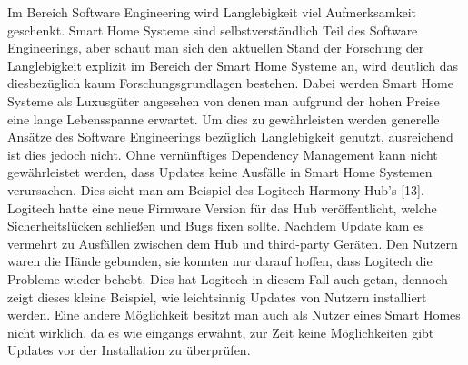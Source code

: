 Im Bereich Software Engineering wird Langlebigkeit viel Aufmerksamkeit geschenkt. Smart Home Systeme sind selbstverständlich Teil des
Software Engineerings, aber schaut man sich den aktuellen Stand der Forschung der Langlebigkeit explizit im Bereich der Smart Home
Systeme an, wird deutlich das diesbezüglich kaum Forschungsgrundlagen bestehen.
Dabei werden Smart Home Systeme als Luxusgüter angesehen von denen man aufgrund der hohen Preise eine lange Lebensspanne erwartet.
Um dies zu gewährleisten werden generelle Ansätze des Software Engineerings bezüglich Langlebigkeit genutzt, ausreichend ist dies jedoch nicht.
Ohne vernünftiges Dependency Management kann nicht gewährleistet werden, dass Updates keine Ausfälle in Smart Home Systemen verursachen.
Dies sieht man am Beispiel des Logitech Harmony Hub's [13]. Logitech hatte eine 
neue Firmware Version für das Hub veröffentlicht, welche Sicherheitslücken schließen und Bugs fixen sollte.
Nachdem Update kam es vermehrt zu Ausfällen zwischen dem Hub und third-party Geräten. Den Nutzern waren die Hände 
gebunden, sie konnten nur darauf hoffen, dass Logitech die Probleme wieder behebt. Dies hat Logitech in diesem Fall auch getan,
dennoch zeigt dieses kleine Beispiel, wie leichtsinnig Updates von Nutzern installiert werden. Eine andere Möglichkeit besitzt man auch als 
Nutzer eines Smart Homes nicht wirklich, da es wie eingangs erwähnt, zur Zeit keine Möglichkeiten gibt Updates vor der Installation zu 
überprüfen.







